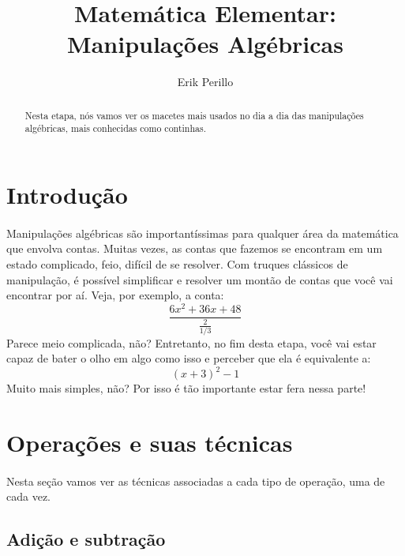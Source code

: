 \documentclass{article}
\begin{document}
\title{Matemática Elementar: Manipulações Algébricas}
\author{Erik Perillo}
\maketitle
\begin{abstract}
Nesta etapa, nós vamos ver os macetes mais usados no dia a dia das 
manipulações algébricas, mais conhecidas como continhas.
\end{abstract}

\newpage

\tableofcontents

\newpage

\section{Introdução}
\paragraph{}
Manipulações algébricas são importantíssimas para qualquer área da matemática
que envolva contas. Muitas vezes, as contas que fazemos se encontram em um
estado complicado, feio, difícil de se resolver. Com truques clássicos de
manipulação, é possível simplificar e resolver um montão de contas que você
vai encontrar por aí. Veja, por exemplo, a conta:
$$\frac{6x^2 + 36x + 48}{\frac{2}{1/3}}$$
Parece meio complicada, não? Entretanto, no fim desta etapa, você vai estar
capaz de bater o olho em algo como isso e perceber que ela é equivalente a:
$${(x + 3)}^2 - 1$$
Muito mais simples, não? Por isso é tão importante estar fera nessa parte!

\section{Operações e suas técnicas}
\paragraph{}
Nesta seção vamos ver as técnicas associadas a cada tipo de operação, uma de
cada vez.

\subsection{Adição e subtração}
\end{document}
